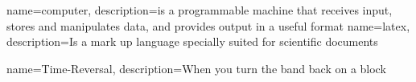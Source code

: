 {
  name=computer,
  description={is a programmable machine that receives input,
               stores and manipulates data, and provides
               output in a useful format}
}
{
    name=latex,
    description={Is a mark up language specially suited
    for scientific documents}
}

{
    name=Time-Reversal,
    description={When you turn the band back on a block}
}
